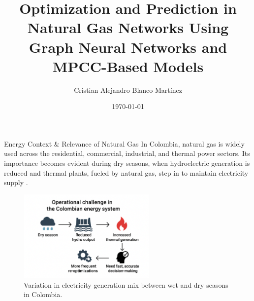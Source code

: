 \documentclass[hyperref={colorlinks,citecolor=blue,linkcolor=blue,urlcolor=blue}]{beamer}
\title[]{Optimization and Prediction in Natural Gas Networks Using Graph Neural Networks and MPCC-Based Models}
\author{Cristian Alejandro Blanco Martínez}
\institute{Universidad Tecnológica de Pereira \\ 
Grupo de investigación Automática}
\date{\today}
\begin{document}
\begin{frame}
  \titlepage
\end{frame}




\begin{frame}{Energy Context \& Relevance of Natural Gas}
\footnotesize
\justifying
In Colombia, natural gas is widely used across the residential, commercial, industrial, and thermal power sectors. Its importance becomes evident during dry seasons, when hydroelectric generation is reduced and thermal plants, fueled by natural gas, step in to maintain electricity supply  \cite{Promigas_2021}.
\\
\begin{figure}[h]
    \centering
    \footnotesize
    \includegraphics[width=0.6\textwidth]{figures/hydro_vs_thermal.png}
    \caption{\footnotesize Variation in electricity generation mix between wet and dry seasons in Colombia.}
\end{figure}
\end{frame}

%
%
%
%
\end{document}
